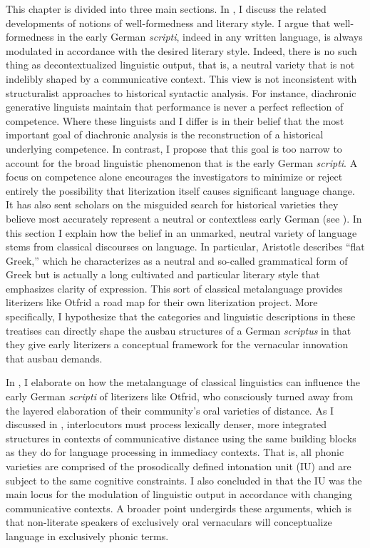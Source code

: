 This chapter is divided into three main sections. In , I discuss the related developments of notions of well-formedness and literary style. I argue that well-formedness in the early German \textit{scripti}, indeed in any written language, is always modulated in accordance with the desired literary style. Indeed, there is no such thing as decontextualized linguistic output, that is, a neutral variety that is not indelibly shaped by a communicative context. This view is not inconsistent with structuralist approaches to historical syntactic analysis. For instance, diachronic generative linguists maintain that performance is never a perfect reflection of competence. Where these linguists and I differ is in their belief that the most important goal of diachronic analysis is the reconstruction of a historical underlying competence. In contrast, I propose that this goal is too narrow to account for the broad linguistic phenomenon that is the early German \textit{scripti}. A focus on competence alone encourages the investigators to minimize or reject entirely the possibility that literization itself causes significant language change. It has also sent scholars on the misguided search for historical varieties they believe most accurately represent a neutral or contextless early German (see ). In this section I explain how the belief in an unmarked, neutral variety of language stems from classical discourses on language. In particular, Aristotle describes “flat Greek,” which he characterizes as a neutral and so-called grammatical form of Greek but is actually a long cultivated and particular literary style that emphasizes clarity of expression. This sort of classical metalanguage provides literizers like Otfrid a road map for their own literization project. More specifically, I hypothesize that the categories and linguistic descriptions in these treatises can directly shape the ausbau structures of a German \textit{scriptus} in that they give early literizers a conceptual framework for the vernacular innovation that ausbau demands.

In , I elaborate on how the metalanguage of classical linguistics can influence the early German \textit{scripti} of literizers like Otfrid, who consciously turned away from the layered elaboration of their community’s oral varieties of distance. As I discussed in , interlocutors must process lexically denser, more integrated structures in contexts of communicative distance using the same building blocks as they do for language processing in immediacy contexts. That is, all phonic varieties are comprised of the prosodically defined intonation unit (IU) and are subject to the same cognitive constraints. I also concluded in  that the IU was the main locus for the modulation of linguistic output in accordance with changing communicative contexts. A broader point undergirds these arguments, which is that non-literate speakers of exclusively oral vernaculars will conceptualize language in exclusively phonic terms.

